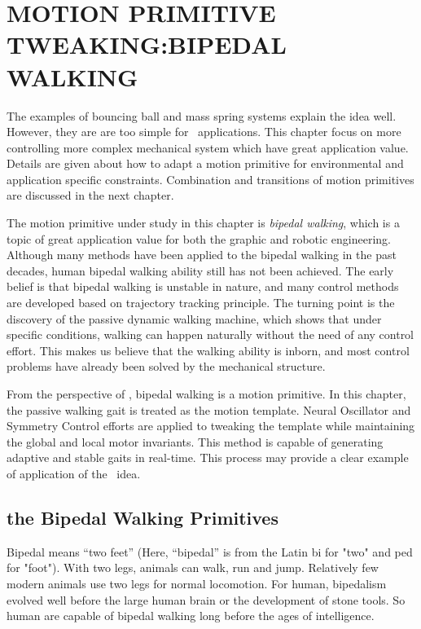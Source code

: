 \chapter{MOTION PRIMITIVE TWEAKING:BIPEDAL WALKING}
\label{chap:walk}
\graphicspath{{BipedWalk/BipedWalkFigs/EPS/}{BipedWalk/BipedWalkFigs/}}


The examples of bouncing ball and mass spring systems explain the idea well.
However, they are are too simple for \cms\ applications.
This chapter focus on more controlling more complex mechanical system which have great application value.  
Details are given about how to adapt a motion primitive for  environmental and application specific constraints.
Combination and transitions of motion primitives are discussed in the next chapter.


The motion primitive under study in this chapter is \emph{bipedal walking}, which is a topic of great application value for both the graphic and robotic engineering.
Although many methods have been applied to the bipedal walking in the past decades, human bipedal walking ability still has not been achieved. 
The early belief is that bipedal walking is unstable in nature, and many control methods are developed based on trajectory tracking principle.
The turning point is the discovery of the passive dynamic walking machine, which shows that under specific conditions, walking can happen naturally without the need of any control effort.
This makes us believe that the walking ability is inborn, and most control problems have already been solved by the mechanical structure.

From the perspective of \moit, bipedal walking is  a motion primitive.
In this chapter, the passive walking gait is treated as the motion template.
Neural Oscillator and Symmetry Control efforts are applied to tweaking the template while maintaining the global and local motor invariants.
This method is capable of generating adaptive and stable gaits in real-time.
This process may provide a clear example of application of the \moit\ idea.




\section{the Bipedal Walking Primitives}


Bipedal means ``two feet'' (Here, ``bipedal'' is from the Latin bi for "two" and ped for "foot"). 
With two legs, animals can walk, run and jump.
Relatively few modern animals use two legs for normal locomotion. 
For human, bipedalism evolved well before the large human brain or the development of stone tools.
So human are capable of bipedal walking long before the ages of intelligence.





